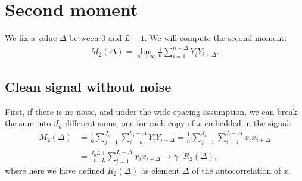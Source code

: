 \documentclass{article}
\theoremstyle{thm}
\theoremstyle{definition}
\newcommand{\1}{\mathbf{1}}
\begin{document}
\begin{comment}

Actually, what Tamir meant when he said first moment was the average of the windows' averages (a scalar), not the average window (a vector). But this also converges a.s.\ to $\gamma \cdot \bar{x}$, by simply exchanging limits and finite sums, as follows. The sample mean of the window starting at index $i$ is just $\frac{1}{L} \sum_{k=0}^{L-1} Y_{i+k}$. Averaging these over all $n$ windows and taking the limit as $n \to \infty$ we get:
%
\begin{align}
%
    \lim_{n\to\infty} \frac{1}{n} \sum_{i=1}^n \frac{1}{L} \sum_{k=0}^{L-1} Y_{i+k}
    =  \frac{1}{L} \sum_{k=0}^{L-1} \lim_{n\to\infty} \frac{1}{n} \sum_{i=1}^n Y_{i+k}
    = \gamma \cdot \bar{x}.
%
\end{align}

\end{comment}

%
%
%

\section{Second moment}

We fix a value $\Delta$ between $0$ and $L-1$. We will compute the second moment:
%
\begin{align}
%
    M_2(\Delta) = 
        \lim_{n \to \infty} \frac{1}{n} \sum_{i=1}^{n-\Delta} Y_i Y_{i+\Delta}.
%
\end{align}


%
%
%

\subsection{Clean signal without noise}

First, if there is no noise, and under the wide spacing assumption, we can break the sum into $J_n$ different sums, one for each copy of $x$ embedded in the signal:
%
\begin{align}
%
    M_2(\Delta) 
        &= \frac{1}{n} \sum_{j=1}^{J_n} \sum_{i=a_j}^{b_j-\Delta} Y_i Y_{i+\Delta}
        = \frac{1}{n} \sum_{j=1}^{J_n} \sum_{i=1}^{L-\Delta} x_i x_{i+\Delta}
    \nonumber \\
    &= \frac{J_n L}{n} \frac{1}{L} \sum_{i=1}^{L-\Delta} x_i x_{i+\Delta}
        \to \gamma \cdot R_2(\Delta),
%
\end{align}
%
where here we have defined $R_2(\Delta)$ as element $\Delta$ of the autocorrelation of $x$. 
%
%
%
\end{document}
